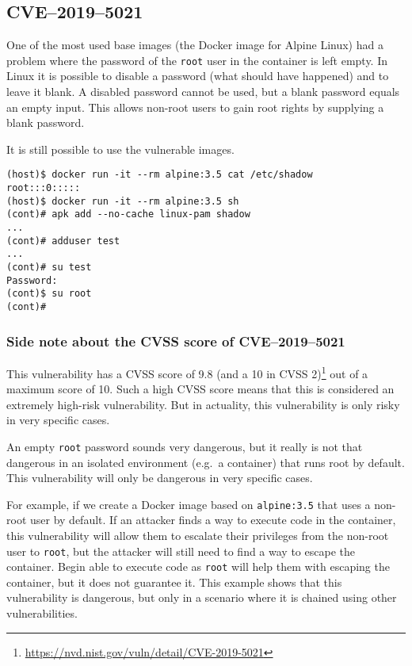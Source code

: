 \subsection{CVE--2019--5021}\label{subsection:CVE-2019-5021}
One of the most used base images (the Docker image for Alpine Linux) had a problem where the password of the \lstinline{root} user in the container is left empty. In Linux it is possible to disable a password (what should have happened) and to leave it blank. A disabled password cannot be used, but a blank password equals an empty input. This allows non-root users to gain root rights by supplying a blank password.

\hfill

It is still possible to use the vulnerable images.
\begin{lstlisting}[caption={The Docker image of Alpine Linux 3.5 has an empty password.},captionpos=b]
(host)$ docker run -it --rm alpine:3.5 cat /etc/shadow
root:::0:::::
(host)$ docker run -it --rm alpine:3.5 sh
(cont)# apk add --no-cache linux-pam shadow
...
(cont)# adduser test
...
(cont)# su test
Password:
(cont)$ su root
(cont)#
\end{lstlisting}

\subsubsection*{Side note about the CVSS score of CVE--2019--5021}

This vulnerability has a CVSS score of 9.8 (and a 10 in CVSS 2)\footnote{\url{https://nvd.nist.gov/vuln/detail/CVE-2019-5021}} out of a maximum score of 10. Such a high CVSS score means that this is considered an extremely high-risk vulnerability. But in actuality, this vulnerability is only risky in very specific cases.

An empty \lstinline{root} password sounds very dangerous, but it really is not that dangerous in an isolated environment (e.g.\ a container) that runs root by default. This vulnerability will only be dangerous in very specific cases.

For example, if we create a Docker image based on \lstinline{alpine:3.5} that uses a non-root user by default. If an attacker finds a way to execute code in the container, this vulnerability will allow them to escalate their privileges from the non-root user to \lstinline{root}, but the attacker will still need to find a way to escape the container. Begin able to execute code as \lstinline{root} will help them with escaping the container, but it does not guarantee it. This example shows that this vulnerability is dangerous, but only in a scenario where it is chained using other vulnerabilities.
